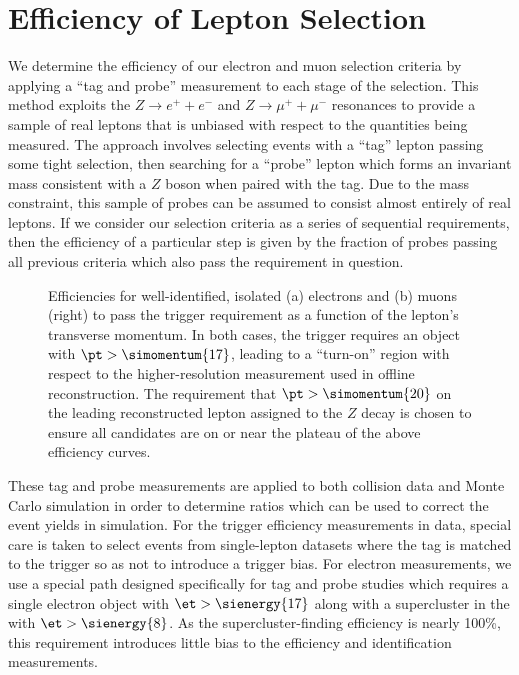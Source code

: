 \section{Efficiency of Lepton Selection}
\label{sec:lepton-selection-efficiency}
We determine the efficiency of our electron and muon selection criteria by applying a ``tag and probe'' measurement to each stage of the selection.  This method exploits the $Z \to e^+ + e^-$ and $Z \to \mu^+ + \mu^-$ resonances to provide a sample of real leptons that is unbiased with respect to the quantities being measured.  The approach involves selecting events with a ``tag'' lepton passing some tight selection, then searching for a ``probe'' lepton which forms an invariant mass consistent with a $Z$ boson when paired with the tag.  Due to the mass constraint, this sample of probes can be assumed to consist almost entirely of real leptons.  If we consider our selection criteria as a series of sequential requirements, then the efficiency of a particular step is given by the fraction of probes passing all previous criteria which also pass the requirement in question.

\begin{figure}
  \centering
  \hfill
  \caption[Efficiencies for isolated electrons and muons to pass the trigger requirement as a function of \pt]{Efficiencies for well-identified, isolated (a) electrons and (b) muons (right) to pass the trigger requirement as a function of the lepton's transverse momentum.  In both cases, the trigger requires an object with $\pt > \simomentum{17}$, leading to a ``turn-on'' region with respect to the higher-resolution \pt measurement used in offline reconstruction.  The requirement that $\pt > \simomentum{20}$ on the leading reconstructed lepton assigned to the $Z$ decay is chosen to ensure all candidates are on or near the plateau of the above efficiency curves.}
  \label{fig:trigger-turnon}
\end{figure}

These tag and probe measurements are applied to both collision data and Monte Carlo simulation in order to determine ratios which can be used to correct the event yields in simulation.  For the trigger efficiency measurements in data, special care is taken to select events from single-lepton datasets where the tag is matched to the trigger so as not to introduce a trigger bias.  For electron measurements, we use a special path designed specifically for tag and probe studies which requires a single electron object with $\et > \sienergy{17}$ along with a supercluster in the \ecal with $\et > \sienergy{8}$.  As the supercluster-finding efficiency is nearly 100\%, this requirement introduces little bias to the efficiency and identification measurements.

